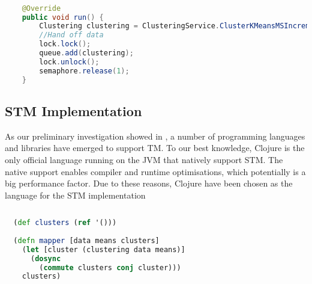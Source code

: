 \begin{lstlisting}[float,label=lst:tl_implementation,
  caption={\ac{TL} Implementation},
  language=Java,  
  showspaces=false,
  showtabs=false,
  breaklines=true,
  showstringspaces=false,
  breakatwhitespace=true,
  commentstyle=\color{greencomments},
  keywordstyle=\color{bluekeywords},
  stringstyle=\color{redstrings}]  % Start your code-block

    @Override
    public void run() {
        Clustering clustering = ClusteringService.ClusterKMeansMSIncremental(data, means);
        //Hand off data
        lock.lock();
        queue.add(clustering);
        lock.unlock();
        semaphore.release(1);
    }  
\end{lstlisting}

\subsection{\ac{STM} Implementation}
As our preliminary investigation showed in , a number of programming languages and libraries have emerged to support TM. To our best knowledge, Clojure is the only official language running on the \ac{JVM} that natively support \ac{STM}. The native support enables compiler and runtime optimisations, which potentially is a big performance factor. Due to these reasons, Clojure have been chosen as the language for the \ac{STM} implementation

\begin{lstlisting}[float,label=lst:stm_implementation,
  caption={\ac{STM} Implementation},
  language=clojure,  
  showspaces=false,
  showtabs=false,
  breaklines=true,
  showstringspaces=false,
  breakatwhitespace=true,
  commentstyle=\color{greencomments},
  keywordstyle=\color{bluekeywords},
  stringstyle=\color{redstrings}]  % Start your code-block
  
  (def clusters (ref '()))
    
  (defn mapper [data means clusters]
    (let [cluster (clustering data means)]
      (dosync
        (commute clusters conj cluster)))
    clusters)
\end{lstlisting}


